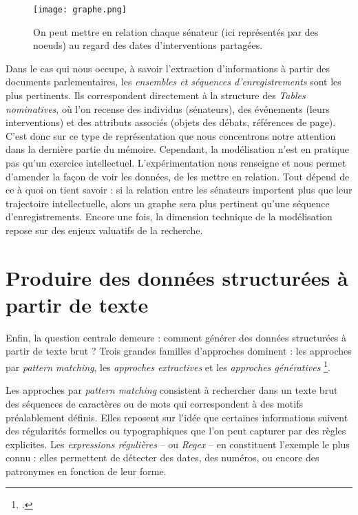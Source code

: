 \begin{figure}[htbp]
\centering
\texttt{[image: graphe.png]}
\caption{On peut mettre en relation chaque sénateur (ici représentés par des noeuds) au regard des dates d'interventions partagées.}
\label{fig:graphe}
\end{figure}

Dans le cas qui nous occupe, à savoir l’extraction d’informations à partir des documents parlementaires, les \emph{ensembles et séquences d’enregistrements} sont les plus pertinents. Ils correspondent directement à la structure des \emph{Tables nominatives}, où l’on recense des individus (sénateurs), des événements (leurs interventions) et des attributs associés (objets des débats, références de page). C’est donc sur ce type de représentation que nous concentrons notre attention dans la dernière partie du mémoire. Cependant, la modélisation n'est en pratique pas qu'un exercice intellectuel. L'expérimentation nous renseigne et nous permet d'amender la façon de voir les données, de les mettre en relation. Tout dépend de ce à quoi on tient savoir : si la relation entre les sénateurs importent plus que leur trajectoire intellectuelle, alors un graphe sera plus pertinent qu'une séquence d'enregistrements. Encore une fois, la dimension technique de la modélisation repose sur des enjeux valuatifs de la recherche.

\section{Produire des données structurées à partir de texte}

Enfin, la question centrale demeure : comment générer des données structurées à partir de texte brut ? Trois grandes familles d’approches dominent : les approches par \emph{pattern matching}, les \emph{approches extractives} et les \emph{approches génératives} \footcite[][]{graham}.

Les approches par \emph{pattern matching} consistent à rechercher dans un texte brut des séquences de caractères ou de mots qui correspondent à des motifs préalablement définis. Elles reposent sur l’idée que certaines informations suivent des régularités formelles ou typographiques que l’on peut capturer par des règles explicites. Les \emph{expressions régulières} -- ou \emph{Regex} -- en constituent l’exemple le plus connu : elles permettent de détecter des dates, des numéros, ou encore des patronymes en fonction de leur forme. 

